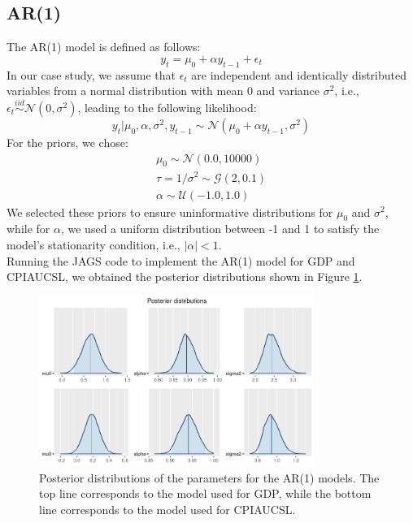 \subsection*{AR(1)}
The AR(1) model is defined as follows:
\begin{equation}
    \label{eq:AR1}
    y_{t} = \mu_{0} + \alpha y_{t-1} + \epsilon_t
\end{equation}
In our case study, we assume that $\epsilon_t$ are independent and identically distributed variables from a normal distribution with mean $0$ and variance $\sigma^2$, i.e., $\epsilon_t \stackrel{iid}{\sim} \mathcal{N}(0,\sigma^2)$, leading to the following likelihood:
\begin{equation}
    \label{eq:AR1_likelihood}
    y_{t}|\mu_{0},\alpha,\sigma^2,y_{t-1} \sim \mathcal{N}(\mu_{0} + \alpha y_{t-1}, \sigma^2)
\end{equation}
For the priors, we chose:
\begin{equation}
    \label{eq:AR1_priors}
    \begin{split}
        \mu_0 \sim \mathcal{N}(0.0, 10000) \\
        \tau = 1 / \sigma^2 \sim \mathcal{G}(2, 0.1) \\
        \alpha \sim \mathcal{U}(-1.0, 1.0)
    \end{split}
\end{equation}
We selected these priors to ensure uninformative distributions for $\mu_{0}$ and $\sigma^2$, while for $\alpha$, we used a uniform distribution between -1 and 1 to satisfy the model's stationarity condition, i.e., $|\alpha| < 1$. \\
Running the JAGS code to implement the AR(1) model for GDP and CPIAUCSL, we obtained the posterior distributions shown in Figure \ref{fig:AR1_posteriors}. \\
\begin{figure}[h]
    \centering
    \includegraphics[width=0.8\textwidth]{images/2-AR/posteriors.png}
    \caption{Posterior distributions of the parameters for the AR(1) models. The top line corresponds to the model used for GDP, while the bottom line corresponds to the model used for CPIAUCSL.}
    \label{fig:AR1_posteriors}
\end{figure}
